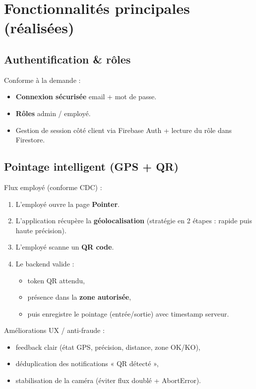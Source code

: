 \documentclass[12pt,a4paper]{article}
\begin{document}
\section{Fonctionnalités principales (réalisées)}
\subsection{Authentification \& rôles}
Conforme à la demande :
\begin{itemize}[leftmargin=*]
  \item \textbf{Connexion sécurisée} email + mot de passe.
  \item \textbf{Rôles} admin / employé.
  \item Gestion de session côté client via Firebase Auth + lecture du rôle dans Firestore.
\end{itemize}

\subsection{Pointage intelligent (GPS + QR)}
Flux employé (conforme CDC) :
\begin{enumerate}[leftmargin=*]
  \item L’employé ouvre la page \textbf{Pointer}.
  \item L’application récupère la \textbf{géolocalisation} (stratégie en 2 étapes : rapide puis haute précision).
  \item L’employé scanne un \textbf{QR code}.
  \item Le backend valide :
  \begin{itemize}
    \item token QR attendu,
    \item présence dans la \textbf{zone autorisée},
    \item puis enregistre le pointage (entrée/sortie) avec timestamp serveur.
  \end{itemize}
\end{enumerate}

Améliorations UX / anti-fraude :
\begin{itemize}[leftmargin=*]
  \item feedback clair (état GPS, précision, distance, zone OK/KO),
  \item déduplication des notifications « QR détecté »,
  \item stabilisation de la caméra (éviter flux doublé + AbortError).
\end{itemize}
\end{document}

